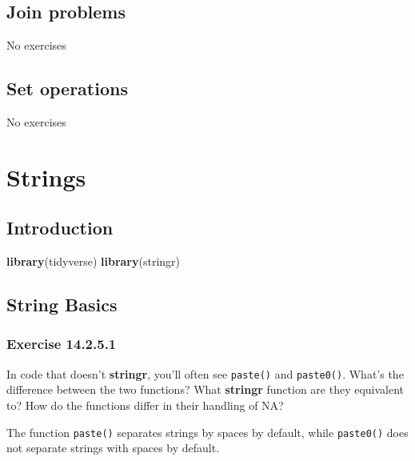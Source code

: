 \documentclass[]{book}
\newenvironment{Shaded}{\begin{snugshade}}{\end{snugshade}}
\newcommand{\KeywordTok}[1]{\textcolor[rgb]{0.13,0.29,0.53}{\textbf{#1}}}
\newcommand{\NormalTok}[1]{#1}
\theoremstyle{plain}
\theoremstyle{remark}
\begin{document}
\hypertarget{join-problems}{%
\section{Join problems}\label{join-problems}}

No exercises

\hypertarget{set-operations}{%
\section{Set operations}\label{set-operations}}

No exercises

\hypertarget{strings}{%
\chapter{Strings}\label{strings}}

\hypertarget{introduction-9}{%
\section{Introduction}\label{introduction-9}}

\begin{Shaded}
\begin{Highlighting}[]
\KeywordTok{library}\NormalTok{(tidyverse)}
\KeywordTok{library}\NormalTok{(stringr)}
\end{Highlighting}
\end{Shaded}

\hypertarget{string-basics}{%
\section{String Basics}\label{string-basics}}

\hypertarget{exercise-14.2.5.1}{%
\subsection*{\texorpdfstring{Exercise
{14.2.5.1}}{Exercise 14.2.5.1}}\label{exercise-14.2.5.1}}

In code that doesn't \textbf{stringr}, you'll often see \texttt{paste()}
and \texttt{paste0()}. What's the difference between the two functions?
What \textbf{stringr} function are they equivalent to? How do the
functions differ in their handling of NA?

The function \texttt{paste()} separates strings by spaces by default,
while \texttt{paste0()} does not separate strings with spaces by
default.
\end{document}
